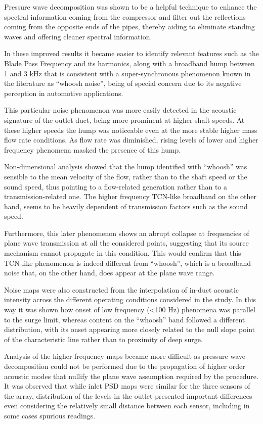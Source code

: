 Pressure wave decomposition was shown to be a helpful technique to enhance the spectral information coming from the compressor and filter out the reflections coming from the opposite ends of the pipes, thereby aiding to eliminate standing waves and offering  cleaner spectral information.

In these improved results it became easier to identify relevant features such as the Blade Pass Frequency and its harmonics, along with a broadband hump between 1 and 3 kHz that is consistent with a super-synchronous phenomenon known in the literature as ``whoosh noise'', being of special concern due to its negative perception in automotive applications.

This particular noise phenomenon was more easily detected in the acoustic signature of the outlet duct, being more prominent at higher shaft speeds. At these higher speeds the hump was noticeable even at the more stable higher mass flow rate conditions. As flow rate was diminished, rising levels of lower and higher frequency phenomena masked the presence of this hump. 

Non-dimensional analysis showed that the hump identified with ``whoosh'' was sensible to the mean velocity of the flow, rather than to the shaft speed or the sound speed, thus pointing to a flow-related generation rather than to a transmission-related one. The higher frequency TCN-like broadband on the other hand, seems to be heavily dependent of transmission factors such as the sound speed. 

Furthermore, this later phenomenon shows an abrupt collapse at frequencies of plane wave transmission at all the considered points, suggesting that its source mechanism cannot propagate in this condition. This would confirm that this TCN-like phenomenon is indeed different from ``whoosh'', which is a broadband noise that, on the other hand, does appear at the plane wave range.

Noise maps were also constructed from the interpolation of in-duct acoustic intensity across the different operating conditions considered in the study. In this way it was shown how onset of low frequency (<100 Hz) phenomena was parallel to the surge limit, whereas content on the ``whoosh'' band followed a different distribution, with its onset appearing more closely related to the null slope point of the characteristic line rather than to proximity of deep surge.

Analysis of the higher frequency maps became more difficult as pressure wave decomposition could not be performed due to the propagation of higher order acoustic modes that nullify the plane wave assumption required by the procedure. It was observed that while inlet PSD maps were similar for the three sensors of the array, distribution of the levels in the outlet presented important differences even considering the relatively small distance between each sensor, including in some cases spurious readings. 

